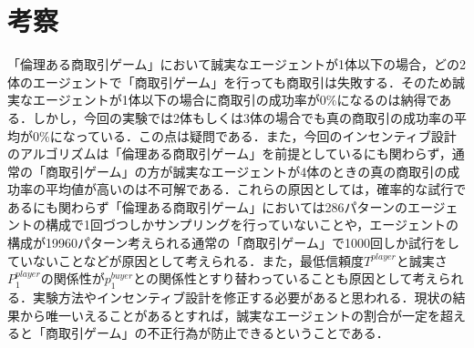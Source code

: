 \section{考察}
「倫理ある商取引ゲーム」において誠実なエージェントが1体以下の場合，どの2体のエージェントで「商取引ゲーム」を行っても商取引は失敗する．そのため誠実なエージェントが1体以下の場合に商取引の成功率が0\%になるのは納得である．しかし，今回の実験では2体もしくは3体の場合でも真の商取引の成功率の平均が0\%になっている．この点は疑問である．また，今回のインセンティブ設計のアルゴリズムは「倫理ある商取引ゲーム」を前提としているにも関わらず，通常の「商取引ゲーム」の方が誠実なエージェントが4体のときの真の商取引の成功率の平均値が高いのは不可解である．これらの原因としては，確率的な試行であるにも関わらず「倫理ある商取引ゲーム」においては286パターンのエージェントの構成で1回づつしかサンプリングを行っていないことや，エージェントの構成が19960パターン考えられる通常の「商取引ゲーム」で1000回しか試行をしていないことなどが原因として考えられる．また，最低信頼度$T^{player}$と誠実さ$P^{player}_1$の関係性が$p^{buyer}_1$との関係性とすり替わっていることも原因として考えられる．実験方法やインセンティブ設計を修正する必要があると思われる．現状の結果から唯一いえることがあるとすれば，誠実なエージェントの割合が一定を超えると「商取引ゲーム」の不正行為が防止できるということである．
